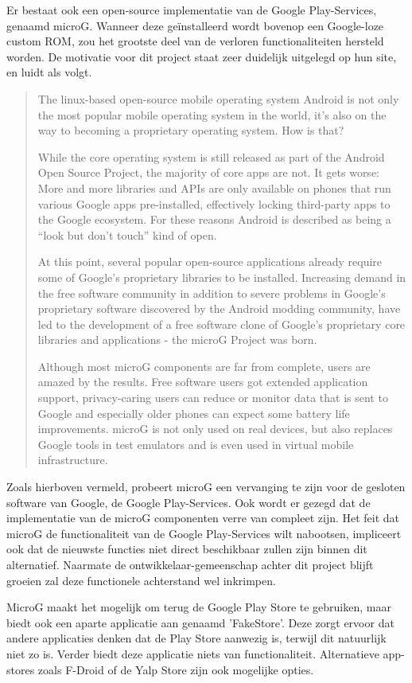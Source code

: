 Er bestaat ook een open-source implementatie van de Google Play-Services, genaamd microG. Wanneer deze geïnstalleerd wordt bovenop een Google-loze custom ROM, zou het grootste deel van de verloren functionaliteiten hersteld worden. De motivatie voor dit project staat zeer duidelijk uitgelegd op hun site, en luidt als volgt. \blockcquote{microg}{
    The linux-based open-source mobile operating system Android is not only the most popular mobile operating system in the world, it’s also on the way to becoming a proprietary operating system. How is that?
    
    While the core operating system is still released as part of the Android Open Source Project, the majority of core apps are not. It gets worse: More and more libraries and APIs are only available on phones that run various Google apps pre-installed, effectively locking third-party apps to the Google ecosystem. For these reasons Android is described as being a “look but don’t touch” kind of open.
    
    At this point, several popular open-source applications already require some of Google’s proprietary libraries to be installed. Increasing demand in the free software community in addition to severe problems in Google’s proprietary software discovered by the Android modding community, have led to the development of a free software clone of Google’s proprietary core libraries and applications - the microG Project was born.
    
    Although most microG components are far from complete, users are amazed by the results. Free software users got extended application support, privacy-caring users can reduce or monitor data that is sent to Google and especially older phones can expect some battery life improvements. microG is not only used on real devices, but also replaces Google tools in test emulators and is even used in virtual mobile infrastructure.
}
Zoals hierboven vermeld, probeert microG een vervanging te zijn voor de gesloten software van Google, de Google Play-Services. Ook wordt er gezegd dat de implementatie van de microG componenten verre van compleet zijn. Het feit dat microG de functionaliteit van de Google Play-Services wilt nabootsen, impliceert ook dat de nieuwste functies niet direct beschikbaar zullen zijn binnen dit alternatief. Naarmate de ontwikkelaar-gemeenschap achter dit project blijft groeien zal deze functionele achterstand wel inkrimpen.

MicroG maakt het mogelijk om terug de Google Play Store te gebruiken, maar biedt ook een aparte applicatie aan genaamd 'FakeStore'. Deze zorgt ervoor dat andere applicaties denken dat de Play Store aanwezig is, terwijl dit natuurlijk niet zo is. Verder biedt deze applicatie niets van functionaliteit. Alternatieve app-stores zoals F-Droid of de Yalp Store zijn ook mogelijke opties. \autocite{shadow53_play-store}

